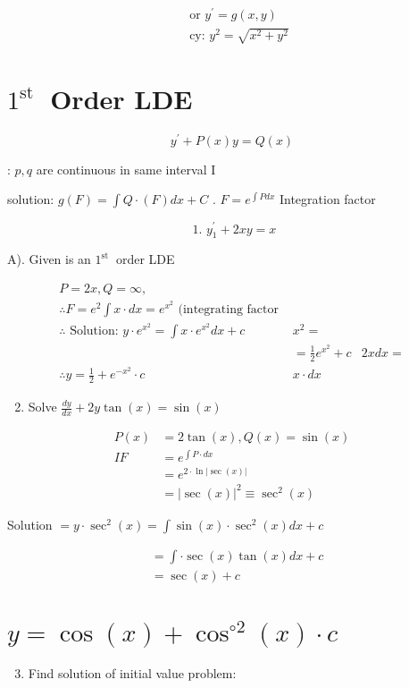 \documentclass[12pt, a4paper]{article}
\begin{document}
$$
\begin{aligned}
& \text { or } y^{\prime}=g(x, y) \\
& \text { cy: } y^{2}=\sqrt{x^{2}+y^{2}}
\end{aligned}
$$

\section*{$1^{\text {st }}$ Order LDE}
$$
y^{\prime}+P(x) y=Q(x)
$$

: $p, q$ are continuous in same interval I

solution: $g(F)=\int Q \cdot(F) d x+C$ . $F=e^{\int P d x}$ Integration factor

$$
\text { 1. } y_{1}^{\prime}+2 x y=x
$$

A). Given is an $1^{\text {st }}$ order LDE

$$
\begin{array}{rlr}
P=2 x, Q=\infty, \\
\therefore F=e^{2} \int x \cdot d x=e^{x^{2}} \text { (integrating factor } \\
\therefore \text { Solution: } y \cdot e^{x^{2}}=\int x \cdot e^{x^{2}} d x+c & x^{2}= \\
& =\frac{1}{2} e^{x^{2}}+c & 2 x d x= \\
\therefore y=\frac{1}{2}+e^{-x^{2}} \cdot c & x \cdot d x
\end{array}
$$

\begin{enumerate}
  \setcounter{enumi}{1}
  \item Solve $\frac{d y}{d x}+2 y \tan (x)=\sin (x)$
\end{enumerate}

$$
\begin{aligned}
P(x) & =2 \tan (x), Q(x)=\sin (x) \\
I F & =e^{\int P \cdot d x} \\
& =e^{2 \cdot \ln |\sec (x)|} \\
& =|\sec (x)|^{2} \equiv \sec ^{2}(x)
\end{aligned}
$$

Solution $=y \cdot \sec ^{2}(x)=\int \sin (x) \cdot \sec ^{2}(x) d x+c$

$$
\begin{aligned}
& =\int \cdot \sec (x) \tan (x) d x+c \\
& =\sec (x)+c
\end{aligned}
$$

\section*{$y=\cos (x)+\cos ^{\circ 2}(x) \cdot c$}
\begin{enumerate}
  \setcounter{enumi}{2}
  \item Find solution of initial value problem:
\end{enumerate}
\end{document}
